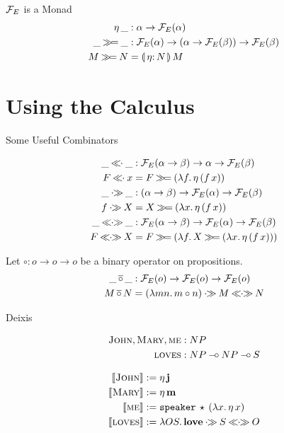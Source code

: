 \documentclass{beamer}
\begin{document}
\begin{frame}{$\mathcal{F}_E$ is a Monad}
 \begin{align*}
   \ap{\eta}{\_} &: \alpha \to \FF_E(\alpha) \\
   \_ \hsbind \_ &: \FF_E(\alpha) \to (\alpha \to \FF_E(\beta)) \to \FF_E(\beta) \\
   M \hsbind N &= \ap{\banana{\onto{\eta}{N}}}{M}
\end{align*}
\end{frame}



\section{Using the Calculus}


\begin{frame}{Some Useful Combinators}
  
\begin{align*}
  \_ \apl \_ &: \FF_E(\alpha \to \beta) \to \alpha \to \FF_E(\beta) \\
  F \apl x &= F \hsbind (\lam{f}{\ap{\eta}{(\ap{f}{x})}}) \\
  \_ \apr \_ &: (\alpha \to \beta) \to \FF_E(\alpha) \to \FF_E(\beta) \\
  f \apr X &= X \hsbind (\lam{x}{\ap{\eta}{(\ap{f}{x})}}) \\
  \_ \aplr \_ &: \FF_E(\alpha \to \beta) \to \FF_E(\alpha) \to \FF_E(\beta) \\
  F \aplr X &= F \hsbind (\lam{f}{X \hsbind (\lam{x}{\ap{\eta}{(\ap{f}{x})}})})
\end{align*}

\vfill
\pause
Let $\circ : o \to o \to o$ be a binary operator on propositions.
\begin{align*}
  \_ \mathop{\overline{\circ}} \_ &: \mathcal{F}_E(o) \to \mathcal{F}_E(o) \to \mathcal{F}_E(o) \\
  M \mathop{\overline{\circ}} N &= (\lambda m n.\, m \circ n) \mathbin{\cdot\!\!\gg} M \mathbin{\ll\!\!\cdot\!\!\gg} N
\end{align*}

\end{frame}


\begin{frame}{Deixis}

\begin{align*}
  \textsc{John}, \textsc{Mary}, \textsc{me} &: NP \\
  \textsc{loves} &: NP \mathbin{{-}\mkern-3.5mu{\circ}} NP \mathbin{{-}\mkern-3.5mu{\circ}} S
\end{align*}

\vfill
\pause

\begin{align*}
  \llbracket \textsc{John} \rrbracket &:= \eta\,\textbf{j} \\
  \llbracket \textsc{Mary} \rrbracket &:= \eta\,\textbf{m} \\
  \llbracket \textsc{me} \rrbracket &:= \mathtt{speaker}\,\star\,(\lambda x.\, \eta\,x) \\
  \llbracket \textsc{loves} \rrbracket &:= \lambda O S.\, {\textbf{love}} \mathbin{\cdot\!\!\gg} S \mathbin{\ll\!\!\cdot\!\!\gg} O
\end{align*}

\end{frame}
\end{document}
